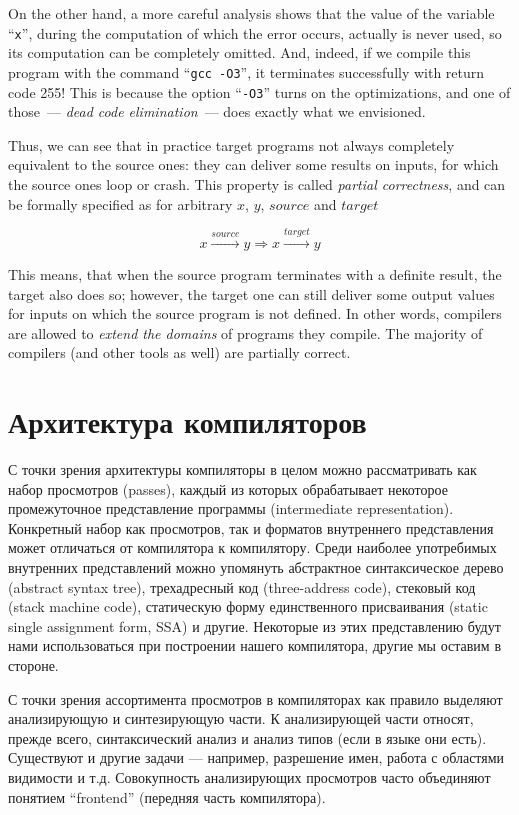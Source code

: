 \documentclass{article}
\begin{document}
On the other hand, a more careful analysis shows that the value of the variable ``\lstinline[language=cc,basicstyle=\normalsize]|x|'', during the computation
of which the error occurs, actually is never used, so its computation can be completely omitted. And, indeed, if we compile this program with the command ``\texttt{gcc -O3}'',
it terminates successfully with return code 255! This is because the option ``\texttt{-O3}'' turns on the optimizations, and one of those~--- \emph{dead code elimination}~---
does exactly what we envisioned.

Thus, we can see that in practice target programs not always completely equivalent to the source ones: they can deliver some results on inputs, for which the source
ones loop or crash. This property is called \emph{partial correctness}, and can be formally specified as for arbitrary $x$, $y$, $source$ and $target$

\[
x\xrightarrow{\displaystyle{source}}y \Longrightarrow x\xrightarrow{\displaystyle{target}}y
\]

This means, that when the source program terminates with a definite result, the target also does so; however, the target one can still deliver some output
values for inputs on which the source program is not defined. In other words, compilers are allowed to \emph{extend the domains} of programs they compile. The
majority of compilers (and other tools as well) are partially correct.

\section{Архитектура компиляторов}

С точки зрения архитектуры компиляторы в целом можно рассматривать как набор просмотров (passes), каждый из которых обрабатывает некоторое
промежуточное представление программы (intermediate representation). Конкретный набор как просмотров, так и форматов внутреннего представления
может отличаться от компилятора к компилятору. Среди наиболее употребимых внутренних представлений можно упомянуть абстрактное синтаксическое дерево
(abstract syntax tree), трехадресный код (three-address code), стековый код (stack machine code), статическую форму единственного присваивания (static
single assignment form, SSA) и другие. Некоторые из этих представлению будут нами использоваться при построении нашего компилятора, другие мы
оставим в стороне.

С точки зрения ассортимента просмотров в компиляторах как правило выделяют анализирующую и синтезирующую части. К анализирующей части относят,
прежде всего, синтаксический анализ и анализ типов (если в языке они есть). Существуют и другие задачи --- например, разрешение имен, работа с
областями видимости и т.д. Совокупность анализирующих просмотров часто объединяют понятием ``frontend'' (передняя часть компилятора).
\end{document}

